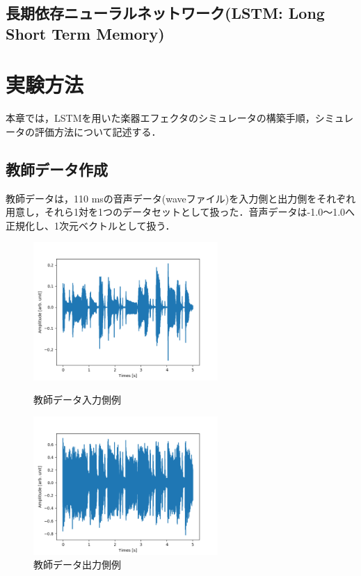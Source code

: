 \documentclass{jreport}		%
\begin{document}
\section{長期依存ニューラルネットワーク(LSTM: Long Short Term Memory)}

\chapter{実験方法}
本章では，LSTMを用いた楽器エフェクタのシミュレータの構築手順，シミュレータの評価方法について記述する．

\section{教師データ作成}
教師データは，110 msの音声データ(waveファイル)を入力側と出力側をそれぞれ用意し，それら1対を1つのデータセットとして扱った．音声データは-1.0～1.0へ正規化し、1次元ベクトルとして扱う．
\begin{figure}[htbp]
 \begin{minipage}{0.5\hsize}
 \begin{center}
  \includegraphics[width=70mm]{train_x0.png}
 \end{center}
 \caption{教師データ入力側例}
 \label{fig:one}
 \end{minipage}
 \begin{minipage}{0.5\hsize}
 \begin{center}
  \includegraphics[width=70mm]{train_y0.png}
 \end{center}
 \caption{教師データ出力側例}
 \label{fig:two}
 \end{minipage}
\end{figure}
\end{document}

